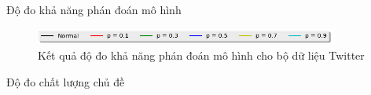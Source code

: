 \documentclass[pdf]{beamer}
\begin{document}
\begin{frame}{Độ đo khả năng phán đoán mô hình}
  \begin{figure}
	\begin{center}
		\captionsetup{justification=centering}
		\includegraphics[width=100mm]{menu.png}
		\caption{Kết quả độ đo khả năng phán đoán mô hình cho bộ dữ liệu Twitter}
	\end{center}
\end{figure}

\end{frame}

\begin{frame}{Độ đo chất lượng chủ đề }
\begin{columns}[T] %
\begin{column}{.50\textwidth}
	\begin{figure}
	\end{figure}
\end{column} %
\hfill%
\begin{column}{.50\textwidth}
	\begin{figure}

\end{figure}
\end{column}
\end{columns}
\end{frame}
\end{document}
